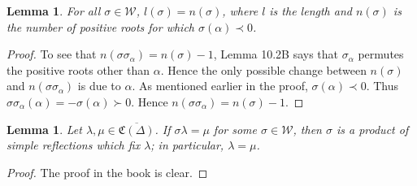 \documentclass{article}
\newcommand{\mf}{\mathfrak}
\newtheorem{lem}[thm]{Lemma}
\begin{document}
\begin{lem} For all $\sigma \in \mathcal W$, $l(\sigma) = n(\sigma)$, where $l$ is the length and $n(\sigma)$ is the number of positive roots for which $\sigma(\alpha) \prec 0$.
\end{lem}
\begin{proof}
To see that $n(\sigma \sigma_\alpha) = n(\sigma) -1$,  Lemma 10.2B says that $\sigma_\alpha$ permutes the positive roots other than $\alpha$.   Hence the only possible change between $n(\sigma)$ and $n(\sigma \sigma_\alpha)$ is due to $\alpha$. As mentioned earlier in the proof, $\sigma(\alpha) \prec 0$.  Thus $\sigma \sigma_\alpha (\alpha) = - \sigma(\alpha) \succ 0$.  Hence $n(\sigma \sigma_\alpha) = n(\sigma) -1$.
\end{proof}

\begin{lem} Let $\lambda, \mu \in \overline{\mf{C}(\Delta)}$.  If $\sigma \lambda = \mu$ for some $\sigma \in \mathcal W$, then $\sigma$ is a product of simple reflections which fix $\lambda$; in particular, $\lambda = \mu$.
\end{lem}
\begin{proof}
The proof in the book is clear.
\end{proof}
\end{document}
